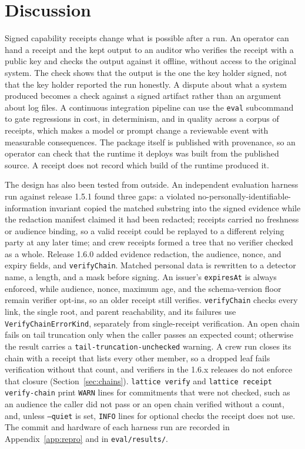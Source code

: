 \documentclass[conference]{IEEEtran}
\newcommand{\code}[1]{\texttt{\small #1}}
\begin{document}
\section{Discussion}

Signed capability receipts change what is possible after a run. An operator can hand a
receipt and the kept output to an auditor who verifies the receipt with a public key and
checks the output against it offline, without access to the original system. The check
shows that the output is the one the key holder signed, not that the key holder reported
the run honestly. A dispute about what a
system produced becomes a check against a signed artifact rather than an argument about
log files. A continuous integration pipeline can use the \code{eval} subcommand to gate
regressions in cost, in determinism, and in quality across a corpus of receipts, which
makes a model or prompt change a reviewable event with measurable consequences. The
package itself is published with provenance, so an operator can check that the runtime
it deploys was built from the published source. A receipt does not record which build
of the runtime produced it.

The design has also been tested from outside. An independent evaluation harness run
against release 1.5.1 \cite{latticeissue21} found three gaps: a violated
no-personally-identifiable-information invariant copied the matched substring into the
signed evidence while the redaction manifest claimed it had been redacted; receipts
carried no freshness or audience binding, so a valid receipt could be replayed to a
different relying party at any later time; and crew receipts formed a tree that no
verifier checked as a whole. Release 1.6.0 \cite{latticepr22} added evidence redaction,
the audience, nonce, and expiry fields, and \code{verifyChain}. Matched personal data is
rewritten to a detector name, a length, and a mask before signing. An issuer's
\code{expiresAt} is always enforced, while audience, nonce, maximum age, and the
schema-version floor remain verifier opt-ins, so an older receipt still verifies.
\code{verifyChain} checks every link, the single root, and parent reachability, and its
failures use \code{VerifyChainErrorKind}, separately from single-receipt verification. An open chain fails on tail truncation only when the caller passes an expected
count; otherwise the result carries a \code{tail-truncation-unchecked} warning. A crew
run closes its chain with a receipt that lists every other member, so a dropped leaf
fails verification without that count, and verifiers in the 1.6.x releases do not
enforce that closure (Section~\ref{sec:chains}). \code{lattice verify} and
\code{lattice receipt verify-chain} print \code{WARN} lines for commitments that were
not checked, such as an audience the caller did not pass or an open chain verified
without a count, and, unless \code{--quiet} is set, \code{INFO} lines for optional checks
the receipt does not use. The commit and hardware of each harness run are recorded in
Appendix~\ref{app:repro} and in \code{eval/results/}.
\end{document}
